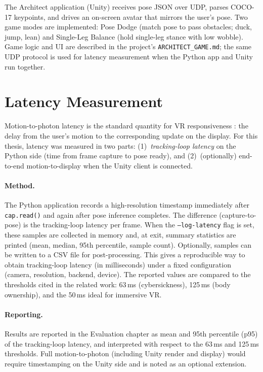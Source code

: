 The Architect application (Unity) receives pose JSON over UDP, parses COCO-17 keypoints, and drives an on-screen avatar that mirrors the user's pose. Two game modes are implemented: Pose Dodge (match pose to pass obstacles; duck, jump, lean) and Single-Leg Balance (hold single-leg stance with low wobble). Game logic and UI are described in the project's \texttt{ARCHITECT\_GAME.md}; the same UDP protocol is used for latency measurement when the Python app and Unity run together.

\section{Latency Measurement}

Motion-to-photon latency is the standard quantity for VR responsiveness \cite{caserman2019latency, warburton2023motionphoton}: the delay from the user's motion to the corresponding update on the display. For this thesis, latency was measured in two parts: (1)~\emph{tracking-loop latency} on the Python side (time from frame capture to pose ready), and (2)~(optionally) end-to-end motion-to-display when the Unity client is connected.

\paragraph{Method.}
The Python application records a high-resolution timestamp immediately after \texttt{cap.read()} and again after pose inference completes. The difference (capture-to-pose) is the tracking-loop latency per frame. When the \texttt{--log-latency} flag is set, these samples are collected in memory and, at exit, summary statistics are printed (mean, median, 95th percentile, sample count). Optionally, samples can be written to a CSV file for post-processing. This gives a reproducible way to obtain tracking-loop latency (in milliseconds) under a fixed configuration (camera, resolution, backend, device). The reported values are compared to the thresholds cited in the related work: 63\,ms (cybersickness), 125\,ms (body ownership), and the 50\,ms ideal for immersive VR.

\paragraph{Reporting.}
Results are reported in the Evaluation chapter as mean and 95th percentile (p95) of the tracking-loop latency, and interpreted with respect to the 63\,ms and 125\,ms thresholds. Full motion-to-photon (including Unity render and display) would require timestamping on the Unity side and is noted as an optional extension.
